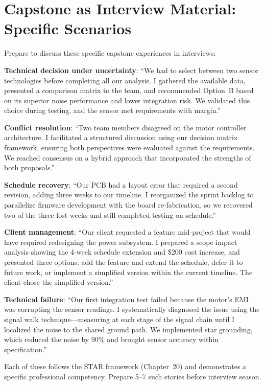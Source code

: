 \section{Capstone as Interview Material: Specific Scenarios}
Prepare to discuss these specific capstone experiences in interviews:

\textbf{Technical decision under uncertainty}: ``We had to select between two sensor technologies before completing all our analysis. I gathered the available data, presented a comparison matrix to the team, and recommended Option~B based on its superior noise performance and lower integration risk. We validated this choice during testing, and the sensor met requirements with margin.''

\textbf{Conflict resolution}: ``Two team members disagreed on the motor controller architecture. I facilitated a structured discussion using our decision matrix framework, ensuring both perspectives were evaluated against the requirements. We reached consensus on a hybrid approach that incorporated the strengths of both proposals.''

\textbf{Schedule recovery}: ``Our PCB had a layout error that required a second revision, adding three weeks to our timeline. I reorganized the sprint backlog to parallelize firmware development with the board re-fabrication, so we recovered two of the three lost weeks and still completed testing on schedule.''

\textbf{Client management}: ``Our client requested a feature mid-project that would have required redesigning the power subsystem. I prepared a scope impact analysis showing the 4-week schedule extension and \$200 cost increase, and presented three options: add the feature and extend the schedule, defer it to future work, or implement a simplified version within the current timeline. The client chose the simplified version.''

\textbf{Technical failure}: ``Our first integration test failed because the motor's EMI was corrupting the sensor readings. I systematically diagnosed the issue using the signal walk technique---measuring at each stage of the signal chain until I localized the noise to the shared ground path. We implemented star grounding, which reduced the noise by 90\% and brought sensor accuracy within specification.''

Each of these follows the STAR framework (Chapter~20) and demonstrates a specific professional competency. Prepare 5--7 such stories before interview season.

